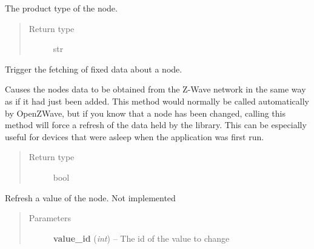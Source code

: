 \documentclass[letterpaper,10pt,english]{sphinxmanual}
\begin{document}
\begin{fulllineitems}
\begin{fulllineitems}
\begin{quote}
\begin{description}
\end{description}\end{quote}

\end{fulllineitems}


\begin{fulllineitems}
\label{node:openzwave.node.ZWaveNode.product_type}
The product type of the node.
\begin{quote}\begin{description}
\item[{Return type}] \leavevmode
str

\end{description}\end{quote}

\end{fulllineitems}


\begin{fulllineitems}
\label{node:openzwave.node.ZWaveNode.refresh_info}
Trigger the fetching of fixed data about a node.

Causes the nodes data to be obtained from the Z-Wave network in the same way
as if it had just been added.  This method would normally be called
automatically by OpenZWave, but if you know that a node has been changed,
calling this method will force a refresh of the data held by the library.  This
can be especially useful for devices that were asleep when the application was
first run.
\begin{quote}\begin{description}
\item[{Return type}] \leavevmode
bool

\end{description}\end{quote}

\end{fulllineitems}


\begin{fulllineitems}
\label{node:openzwave.node.ZWaveNode.refresh_value}
Refresh a value of the node.
Not implemented
\begin{quote}\begin{description}
\item[{Parameters}] \leavevmode
\textbf{value\_id} (\emph{int}) -- The id of the value to change


\end{description}
\end{quote}
\end{fulllineitems}
\end{fulllineitems}
\end{document}
